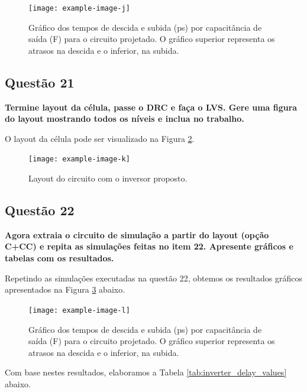 ﻿\documentclass[12pt,a4paper]{article}
\begin{document}
\begin{figure}[H]
    \centering
    \texttt{[image: example-image-j]}
    \caption{Gráfico dos tempos de descida e subida (ps) por capacitância de saída (F) para o circuito projetado. O gráfico superior representa os atrasos na descida e o inferior, na subida.}
    \label{fig:inverter_delay_graphs}
\end{figure}

\subsection*{Questão 21}

	\textbf{Termine layout da célula, passe o DRC e faça o LVS. Gere uma figura do layout mostrando todos os níveis e inclua no trabalho.}

O layout da célula pode ser visualizado na Figura \ref{fig:cell_layout}.

\begin{figure}[H]
    \centering
    \texttt{[image: example-image-k]}
    \caption{Layout do circuito com o inversor proposto.}
    \label{fig:cell_layout}
\end{figure}

\subsection*{Questão 22}

	\textbf{Agora extraia o circuito de simulação a partir do layout (opção C+CC) e repita as simulações feitas no item 22. Apresente gráficos e tabelas com os resultados.}

Repetindo as simulações executadas na questão 22, obtemos os resultados gráficos apresentados na Figura \ref{fig:inverter_cc_delay_graphs} abaixo.

\begin{figure}[H]
    \centering
    \texttt{[image: example-image-l]}
    \caption{Gráfico dos tempos de descida e subida (ps) por capacitância de saída (F) para o circuito projetado. O gráfico superior representa os atrasos na descida e o inferior, na subida.}
    \label{fig:inverter_cc_delay_graphs}
\end{figure}

Com base nestes resultados, elaboramos a Tabela \ref{tab:inverter_delay_values} abaixo.
\end{document}
